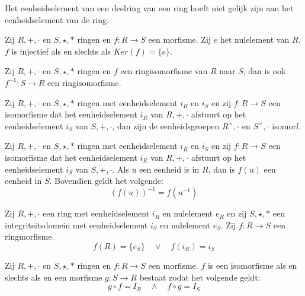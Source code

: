 \documentclass[main.tex]{subfiles}
\begin{document}
\begin{opm}
  Het eenheidselement van een deelring van een ring hoeft niet gelijk zijn aan het eenheidselement van de ring.
\end{opm}

\begin{ei}
  Zij $R,+,\cdot$ en $S,\star,*$ ringen en $f:R \rightarrow S$ een morfisme.
  Zij $e$ het nulelement van $R$.
  $f$ is injectief als en slechts als $Ker(f) = \{e\}$.
\end{ei}

\begin{ei}
  Zij $R,+,\cdot$ en $S,\star,*$ ringen en $f$ een ringisomorfisme van $R$ naar $S$, dan is ook $f^{-1}: S \rightarrow R$ een ringisomorfisme.
\end{ei}

\begin{st}
  Zij $R,+,\cdot$ en $S,\star,*$ ringen met eenheidselement $i_{R}$ en $i_{S}$ en zij $f: R\rightarrow S$ een isomorfisme dat het eenheidselement $i_{R}$ van $R,+,\cdot$ afstuurt op het eenheidselement $i_{S}$ van $S,+,\cdot$, dan zijn de eenheidsgroepen $R^{\times},\cdot$ en $S^{\times},\cdot$ isomorf.
\end{st}

\begin{ei}
  Zij $R,+,\cdot$ en $S,\star,*$ ringen met eenheidselement $i_{R}$ en $i_{S}$ en zij $f: R\rightarrow S$ een isomorfisme dat het eenheidselement $i_{R}$ van $R,+,\cdot$ afstuurt op het eenheidselement $i_{S}$ van $S,+,\cdot$.
  Als $u$ een eenheid is in $R$, dan is $f(u)$ een eenheid in $S$.
  Bovendien geldt het volgende:
  \[ (f(u))^{-1} = f(u^{-1}) \]
\end{ei}

\begin{pr}
  Zij $R,+,\cdot$ een ring met eenheidselement $i_{R}$ en nulelement $e_{R}$ en zij $S,\star,*$ een integriteitsdomein met eenheidselement $i_{S}$ en nulelement $e_{S}$.
  Zij $f: R \rightarrow S$ een ringmorfisme.
  \[ f(R) = \{e_{S}\} \quad\vee\quad f(i_{R}) = i_{S} \]
\end{pr}

\begin{pr}
  Zij $R,+,\cdot$ en $S,\star,*$ ringen en $f: R \rightarrow S$ een morfisme.
  $f$ is een isomorfisme als en slechts als en een morfisme $g: S \rightarrow R$ bestaat zodat het volgende geldt:
  \[ g \circ f = I_{R} \quad\wedge\quad f \circ g = I_{S} \]
\end{pr}
\end{document}
